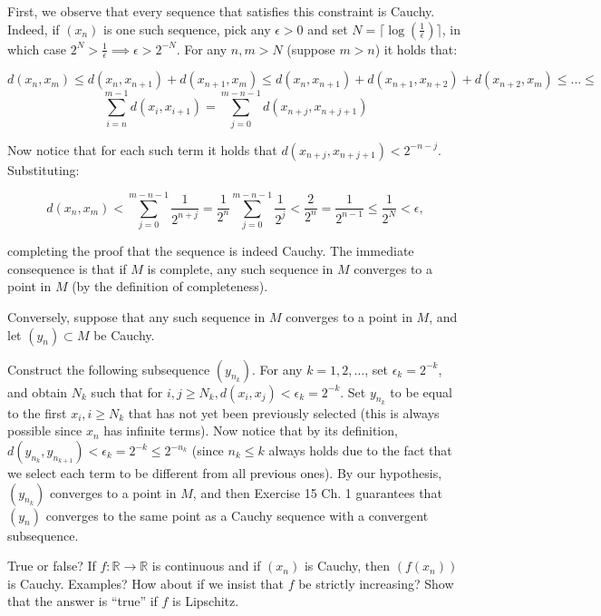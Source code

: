 \begin{solution}
    
    First, we observe that every sequence that satisfies this constraint is Cauchy.
    Indeed, if $(x_n)$ is one such sequence, pick any $\epsilon > 0$ and set $N = \lceil \log(\frac{1}{\epsilon}) \rceil$, in which case $2^N > \frac{1}{\epsilon} \implies \epsilon > 2^{-N}$.
    For any $n, m > N$ (suppose $m > n$) it holds that:

    \[d(x_n, x_m) \leq d(x_n, x_{n+1}) + d(x_{n+1}, x_m) \leq d(x_n, x_{n+1}) + d(x_{n + 1}, x_{n + 2}) + d(x_{n + 2}, x_m) \leq \ldots \leq\]
    \[\sum_{i = n}^{m - 1} d(x_i, x_{i+1}) = \sum_{j = 0}^{m - n - 1} d(x_{n + j}, x_{n + j + 1})\]

    Now notice that for each such term it holds that $d(x_{n + j}, x_{n + j + 1}) < 2^{-n - j}$.
    Substituting:

    \[d(x_n, x_m) < \sum_{j = 0}^{m - n - 1} \frac{1}{2^{n + j}} = \frac{1}{2^{n}} \sum_{j = 0}^{m - n - 1} \frac{1}{2^j} < \frac{2}{2^n} = \frac{1}{2^{n - 1}} \leq \frac{1}{2^N} < \epsilon,\]

    completing the proof that the sequence is indeed Cauchy.
    The immediate consequence is that if $M$ is complete, any such sequence in $M$ converges to a point in $M$ (by the definition of completeness).

    Conversely, suppose that any such sequence in $M$ converges to a point in $M$, and let $(y_n) \subset M$ be Cauchy.

    Construct the following subsequence $(y_{n_k})$.
    For any $k = 1, 2, \ldots$, set $\epsilon_k = 2^{-k}$, and obtain $N_k$ such that for $i, j \geq N_k, d(x_i, x_j) < \epsilon_k = 2^{-k}$.
    Set $y_{n_k}$ to be equal to the first $x_i, i \geq N_k$ that has not yet been previously selected (this is always possible since $x_n$ has infinite terms).
    Now notice that by its definition, $d(y_{n_k}, y_{n_{k+1}}) < \epsilon_k = 2^{-k} \leq 2^{-n_k}$ (since $n_k \leq k$ always holds due to the fact that we select each term to be different from all previous ones).
    By our hypothesis, $(y_{n_k})$ converges to a point in $M$, and then Exercise 15 Ch. 1 guarantees that $(y_n)$ converges to the same point as a Cauchy sequence with a convergent subsequence.
\end{solution}

\begin{exercise}{25}
    True or false?
    If $f: \mathbb{R} \rightarrow \mathbb{R}$ is continuous and if $(x_n)$ is Cauchy, then $(f(x_n))$ is Cauchy.
    Examples?
    How about if we insist that $f$ be strictly increasing?
    Show that the answer is ``true'' if $f$ is Lipschitz.
\end{exercise}

\begin{solution}
    
    
\end{solution}